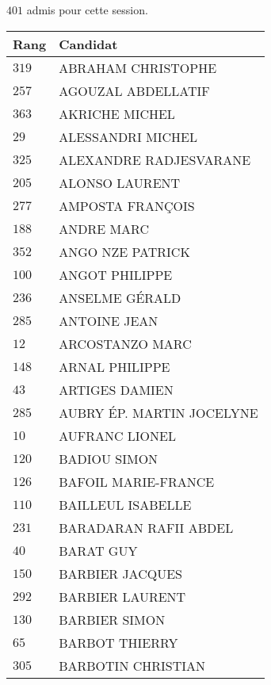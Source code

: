



  $401$ admis pour cette session.

  \begin{xltabular}{\linewidth}{|l|X|}
    \hline
    \textbf{Rang} & \textbf{Candidat} \\
    \hline
    $319$ & ABRAHAM CHRISTOPHE \\
    \hline
    $257$ & AGOUZAL ABDELLATIF \\
    \hline
    $363$ & AKRICHE MICHEL \\
    \hline
    $29$ & ALESSANDRI MICHEL \\
    \hline
    $325$ & ALEXANDRE RADJESVARANE \\
    \hline
    $205$ & ALONSO LAURENT \\
    \hline
    $277$ & AMPOSTA FRANÇOIS \\
    \hline
    $188$ & ANDRE MARC \\
    \hline
    $352$ & ANGO NZE PATRICK \\
    \hline
    $100$ & ANGOT PHILIPPE \\
    \hline
    $236$ & ANSELME GÉRALD \\
    \hline
    $285$ & ANTOINE JEAN \\
    \hline
    $12$ & ARCOSTANZO MARC \\
    \hline
    $148$ & ARNAL PHILIPPE \\
    \hline
    $43$ & ARTIGES DAMIEN \\
    \hline
    $285$ & AUBRY ÉP. MARTIN JOCELYNE \\
    \hline
    $10$ & AUFRANC LIONEL \\
    \hline
    $120$ & BADIOU SIMON \\
    \hline
    $126$ & BAFOIL MARIE-FRANCE \\
    \hline
    $110$ & BAILLEUL ISABELLE \\
    \hline
    $231$ & BARADARAN RAFII ABDEL \\
    \hline
    $40$ & BARAT GUY \\
    \hline
    $150$ & BARBIER JACQUES \\
    \hline
    $292$ & BARBIER LAURENT \\
    \hline
    $130$ & BARBIER SIMON \\
    \hline
    $65$ & BARBOT THIERRY \\
    \hline
    $305$ & BARBOTIN CHRISTIAN \\

\end{xltabular}
